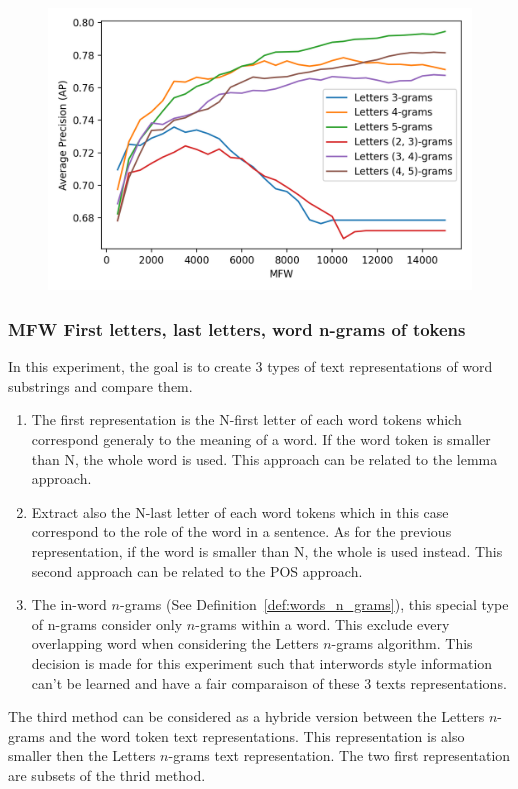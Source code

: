 \begin{figure}
  \label{fig:letter_ngrams_st_jean}
  \includegraphics[width=\linewidth]{img/letter_ngrams_st_jean.png}
\end{figure}

\subsubsection{MFW First letters, last letters, word n-grams of tokens}

In this experiment, the goal is to create 3 types of text representations of word substrings and compare them.

\begin{enumerate}
  \item
  The first representation is the N-first letter of each word tokens which correspond generaly to the meaning of a word.
  If the word token is smaller than N, the whole word is used.
  This approach can be related to the lemma approach.
  \item
  Extract also the N-last letter of each word tokens which in this case correspond to the role of the word in a sentence.
  As for the previous representation, if the word is smaller than N, the whole is used instead.
  This second approach can be related to the POS approach.
  \item
  The in-word $n$-grams (See Definition~\ref{def:words_n_grams}), this special type of n-grams consider only $n$-grams within a word.
  This exclude every overlapping word when considering the Letters $n$-grams algorithm.
  This decision is made for this experiment such that interwords style information can't be learned and have a fair comparaison of these 3 texts representations.
\end{enumerate}
The third method can be considered as a hybride version between the Letters $n$-grams and the word token text representations.
This representation is also smaller then the Letters $n$-grams text representation.
The two first representation are subsets of the thrid method.


